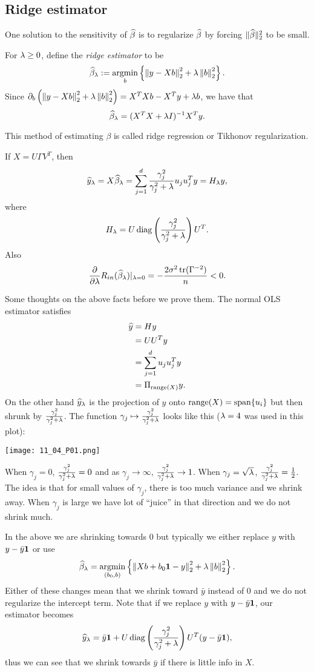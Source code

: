 \subsection{Ridge estimator}
One solution to the sensitivity of $\widehat{\beta}$ is to regularize $\widehat{\beta}$ by forcing $\Vert \widehat{\beta}\Vert_2^2$ to be small.
\begin{defn}
    For $\lambda \ge 0$, define the \emph{ridge estimator} to be 
    \[\widehat{\beta}_\lambda := \operatorname*{argmin}_b\left\{\left\|y-Xb\right\|_2^2+\lambda\left\|b\right\|_2^2\right\}. \]
    Since $\partial_b \left(\left\|y-Xb\right\|_2^2+\lambda\left\|b\right\|_2^2\right) = X^TXb - X^Ty+\lambda b$, we have that 
    \[ \widehat{\beta}_\lambda = (X^TX+\lambda I)^{-1}X^Ty.\]
\end{defn}
This method of estimating $\beta$ is called ridge regression or Tikhonov regularization. 
\begin{fact}
    If $X=U\Gamma V^T$, then 
    \[\widehat{y}_\lambda = X\widehat{\beta}_\lambda = \sum_{j=1}^d \frac{\gamma_j^2}{\gamma_j^2+\lambda}u_ju_j^Ty = H_\lambda y, \]
    where 
    \[H_\lambda = U\operatorname*{diag}\left(\frac{\gamma_j^2}{\gamma_j^2+\lambda}\right)U^T. \]
    Also 
    \[\frac{\partial}{\partial \lambda} R_{in}(\widehat{\beta}_\lambda)|_{\lambda = 0} = -\frac{2\sigma^2\operatorname*{tr}(\Gamma^{-2})}{n} < 0. \]
\end{fact}
Some thoughts on the above facts before we prove them. The normal OLS estimator satisfies 
\begin{align*}
    \widehat{y} &=Hy\\
    &=UU^Ty\\
    &=\sum_{j=1}^d u_ju_j^Ty \\
    &=\Pi_{\operatorname{range}(X)} y.
\end{align*}
On the other hand $\widehat{y}_\lambda$ is the projection of $y$ onto $\operatorname{range}(X) = \operatorname{span}\{u_i\}$ but then shrunk by $\frac{\gamma_j^2}{\gamma_j^2+\lambda}$. The function $\gamma_j \mapsto \frac{\gamma_j^2}{\gamma_j^2+\lambda}$ looks like this ($\lambda = 4$ was used in this plot):
\begin{center}
    \texttt{[image: 11\_04\_P01.png]}
\end{center}
When $\gamma_j = 0$, $\frac{\gamma_j^2}{\gamma_j^2+\lambda}=0$ and as $\gamma_j \to \infty$, $\frac{\gamma_j^2}{\gamma_j^2+\lambda} \to 1$. When $\gamma_j = \sqrt{\lambda}$, $\frac{\gamma_j^2}{\gamma_j^2+\lambda} = \frac{1}{2}$. The idea is that for small values of $\gamma_j$, there is too much variance and we shrink away. When $\gamma_j$ is large we have lot of ``juice'' in that direction and we do not shrink much.
\begin{remark}
    In the above we are shrinking towards 0 but typically we either replace $y$ with $y-\bar{y}{{\bf 1}}$ or use 
    \[\widehat{\beta}_\lambda = \operatorname*{argmin}_{(b_0,b)}\left\{\left\|Xb+b_0{{\bf 1}} - y\right\|_2^2 + \lambda\left\|b\right\|_2^2\right\}. \]
    Either of these changes mean that we shrink toward $\bar{y}$ instead of 0 and we do not regularize the intercept term. Note that if we replace $y$ with $y-\bar{y}{{\bf 1}}$, our estimator becomes
    \[\widehat{y}_\lambda = \bar{y}{{\bf 1}} +U\operatorname*{diag}\left(\frac{\gamma_j^2}{\gamma_j^2+\lambda}\right)U^T(y-\bar{y}{{\bf 1}}), \]
    thus we can see that we shrink towards $\bar{y}$ if there is little info in $X$. 
\end{remark}
